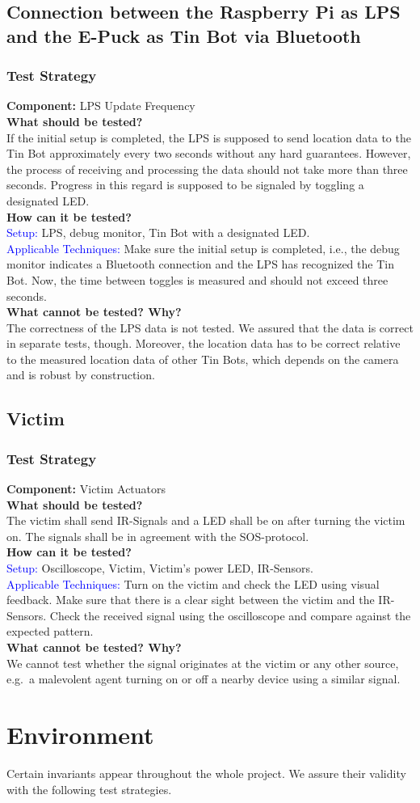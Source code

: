 \documentclass[a4paper,parskip,headheight=38pt]{scrartcl} %
\newcommand{\teststrat}[5]{
    \subsubsection{Test Strategy}
	\textbf{Component:} #1 \\
	\noindent\textbf{What should be tested?} \\
    \noindent #2 \\
	\noindent\textbf{How can it be tested?} \\
    \noindent\textcolor{blue}{Setup:} #3 \\
    \noindent\textcolor{blue}{Applicable Techniques:} #4 \\
	\noindent\textbf{What cannot be tested? Why?} \\
    \noindent #5
}
\newcommand{\ie}{i.e.}
\begin{document}
\subsection{Connection between the Raspberry Pi as LPS and the E-Puck as Tin Bot
via Bluetooth}

\teststrat{LPS Update Frequency}{
    If the initial setup is completed, the LPS is supposed to send location data
    to the Tin Bot approximately every two seconds without any hard guarantees.
    However, the process of receiving and processing the data should not take
    more than three seconds. Progress in this regard is supposed to be signaled
    by toggling a designated LED.
}{
    LPS, debug monitor, Tin Bot with a designated LED.
}{
    Make sure the initial setup is completed, \ie, the debug monitor indicates a
    Bluetooth connection and the LPS has recognized the Tin Bot. Now, the time
    between toggles is measured and should not exceed three seconds.
}{
    The correctness of the LPS data is not tested. We assured that the data is
    correct in separate tests, though. Moreover, the location data has to be
    correct relative to the measured location data of other Tin Bots, which
    depends on the camera and is robust by construction.
}

\subsection{Victim}

\teststrat{Victim Actuators}{
    The victim shall send IR-Signals and a LED shall be on after turning the
    victim on. The signals shall be in agreement with the SOS-protocol.
}{
    Oscilloscope, Victim, Victim's power LED, IR-Sensors.
}{
    Turn on the victim and check the LED using visual feedback. Make sure that
    there is a clear sight between the victim and the IR-Sensors. Check the
    received signal using the oscilloscope and compare against the expected
    pattern.
}{
    We cannot test whether the signal originates at the victim or any other
    source, e.g.\ a malevolent agent turning on or off a nearby device using a
    similar signal.
}

\section{Environment}

Certain invariants appear throughout the whole project. We assure their validity
with the following test strategies.
\end{document}
